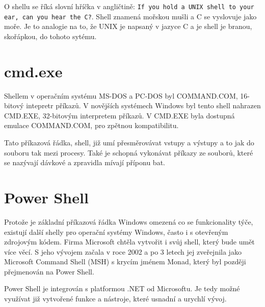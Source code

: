 \documentclass[thesis=M,czech]{FITthesis}[2012/06/26]
\begin{document}
O shellu se říká slovní hříčka v angličtině: \texttt{If you hold a UNIX shell to your ear, can you hear the C?}. Shell znamená mořskou mušli a C se vyslovuje jako moře. Je to analogie na to, že UNIX je napsaný v jazyce C a je shell je branou, skořápkou, do tohoto sytému.






\section{cmd.exe}

Shellem v operačním systému MS-DOS a PC-DOS byl COMMAND.COM, 16-bitový intepretr příkazů. V novějších systémech Windows byl tento shell nahrazen CMD.EXE, 32-bitovým interpretem příkazů. V CMD.EXE byla dostupná emulace COMMAND.COM, pro zpětnou kompatibilitu. 

Tato příkazová řádka, shell, již umí přesměrovávat vstupy a výstupy a to jak do souboru tak mezi procesy. Také je schopná vykonávat příkazy ze souborů, které se nazývají dávkové a zpravidla mívají příponu bat.



\section{Power Shell}

Protože je základní příkazová řádka Windows omezená co se funkcionality týče, existují další shelly pro operační systémy Windows, často i s otevřeným zdrojovým kódem. Firma Microsoft chtěla vytvořit i svůj shell, který bude umět více věcí. S jeho vývojem začala v roce 2002 a po 3 letech jej zveřejnila jako Microsoft Command Shell (MSH) s krycím jménem Monad, který byl později přejmenován na Power Shell.

Power Shell je integrován s platformou .NET od Microsoftu. Je tedy možné využívat již vytvořené funkce a nástroje, které usnadní a urychlí vývoj.
\end{document}
